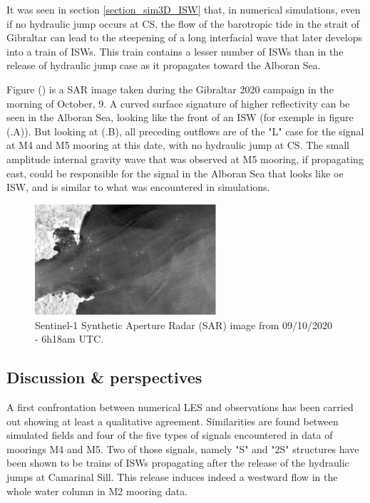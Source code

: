 It was seen in section \ref{section_sim3D_ISW} that, in numerical simulations, even if no hydraulic jump occurs at CS, the flow of the barotropic tide in the strait of Gibraltar can lead to the steepening of a long interfacial wave that later develops into a train of ISWs. This train contains a lesser number of ISWs than in the release of hydraulic jump case as it propagates toward the Alboran Sea. 

Figure () is a SAR image taken during the Gibraltar 2020 campaign in the morning of October, 9. A curved surface signature of higher reflectivity can be seen in the Alboran Sea, looking like the front of an ISW (for exemple in figure (.A)). But looking at (.B), all preceding outflows are of the "L" case for the signal at M4 and M5 mooring at this date, with no hydraulic jump at CS. The small amplitude internal gravity wave that was observed at M5 mooring, if propagating east, could be responsible for the signal in the Alboran Sea that looks like oe ISW, and is similar to what was encountered in simulations.

\begin{figure}[!h]
 \centering
 \includegraphics[width=0.6\textwidth]{./GBR3D/SAR_OBS_GEPETO.png}
 \caption {Sentinel-1 Synthetic Aperture Radar (SAR) image from 09/10/2020 - 6h18am UTC.}
 \label{fig_SAROBS}
\end{figure}


\subsection{Discussion \& perspectives}

A first confrontation between numerical LES and observations has been carried out showing at least a qualitative agreement. Similarities are found between simulated fields and four of the five types of signals encountered in data of moorings M4 and M5. Two of those signals, namely "S" and "2S" structures have been shown to be trains of ISWs propagating after the release of the hydraulic jumps at Camarinal Sill. This release induces indeed a westward flow in the whole water column in M2 mooring data. 

